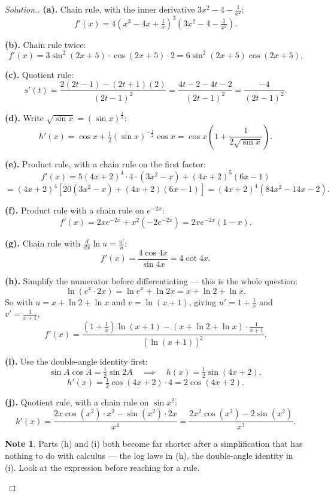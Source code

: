 \documentclass[11pt,a4paper]{article}
\theoremstyle{definition}
\newtheorem{note}[thm]{Note}
\newenvironment{solution}
  {\renewcommand{\qedsymbol}{}\begin{proof}[\textit{Solution}.]}
  {\end{proof}}
\begin{document}
\begin{solution}
\textbf{(a).} Chain rule, with the inner derivative
$3x^2-4-\frac{1}{x^2}$:
$$f'(x)=4\left(x^3-4x+\tfrac{1}{x}\right)^3\left(3x^2-4-\tfrac{1}{x^2}\right).$$

\textbf{(b).} Chain rule twice:
$$f'(x)=3\sin^2(2x+5)\cdot\cos(2x+5)\cdot 2=6\sin^2(2x+5)\cos(2x+5).$$

\textbf{(c).} Quotient rule:
$$s'(t)=\frac{2(2t-1)-(2t+1)(2)}{(2t-1)^2}=\frac{4t-2-4t-2}{(2t-1)^2}
=\frac{-4}{(2t-1)^2}.$$

\textbf{(d).} Write $\sqrt{\sin x}=(\sin x)^{\frac{1}{2}}$:
$$h'(x)=\cos x+\tfrac{1}{2}(\sin x)^{-\frac{1}{2}}\cos x
=\cos x\left(1+\frac{1}{2\sqrt{\sin x}}\right).$$

\textbf{(e).} Product rule, with a chain rule on the first factor:
$$f'(x)=5(4x+2)^4\cdot 4\cdot\left(3x^2-x\right)+(4x+2)^5(6x-1)$$
$$=(4x+2)^4\left[20\left(3x^2-x\right)+(4x+2)(6x-1)\right]
=(4x+2)^4\left(84x^2-14x-2\right).$$

\textbf{(f).} Product rule with a chain rule on $e^{-2x}$:
$$f'(x)=2xe^{-2x}+x^2\left(-2e^{-2x}\right)=2xe^{-2x}(1-x).$$

\textbf{(g).} Chain rule with $\frac{d}{dx}\ln u=\frac{u'}{u}$:
$$f'(x)=\frac{4\cos 4x}{\sin 4x}=4\cot 4x.$$

\textbf{(h).} Simplify the numerator before differentiating --- this is the whole
question:
$$\ln\left(e^x\cdot 2x\right)=\ln e^x+\ln 2x=x+\ln 2+\ln x.$$
So with $u=x+\ln 2+\ln x$ and $v=\ln(x+1)$, giving $u'=1+\frac{1}{x}$ and
$v'=\frac{1}{x+1}$,
$$f'(x)=\frac{\left(1+\frac{1}{x}\right)\ln(x+1)
-\left(x+\ln 2+\ln x\right)\cdot\frac{1}{x+1}}{\left[\ln(x+1)\right]^2}.$$

\textbf{(i).} Use the double-angle identity first:
$$\sin A\cos A=\tfrac{1}{2}\sin 2A\quad\implies\quad
h(x)=\tfrac{1}{2}\sin(4x+2),$$
$$h'(x)=\tfrac{1}{2}\cos(4x+2)\cdot 4=2\cos(4x+2).$$

\textbf{(j).} Quotient rule, with a chain rule on $\sin x^2$:
$$k'(x)=\frac{2x\cos\left(x^2\right)\cdot x^2-\sin\left(x^2\right)\cdot 2x}{x^4}
=\frac{2x^2\cos\left(x^2\right)-2\sin\left(x^2\right)}{x^3}.$$

\begin{note}
Parts (h) and (i) both become far shorter after a simplification that has nothing to do
with calculus --- the log laws in (h), the double-angle identity in (i). Look at the
expression before reaching for a rule.
\end{note}
\end{solution}
\end{document}
